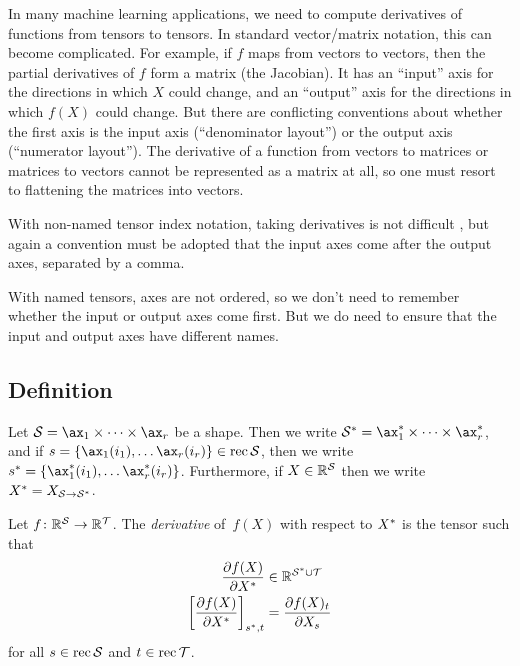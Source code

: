 In many machine learning applications, we need to compute derivatives of functions from tensors to tensors. In standard vector/matrix notation, this can become complicated.
For example, if $f$ maps from vectors to vectors, then the partial derivatives of $f$ form a matrix (the Jacobian). It has an ``input'' axis for the directions in which $X$ could change, and an ``output'' axis for the directions in which $f(X)$ could change.
But there are conflicting conventions about whether the first axis is the input axis (``denominator layout'') or the output axis (``numerator layout''). The derivative of a function from vectors to matrices or matrices to vectors cannot be represented as a matrix at all, so one must resort to flattening the matrices into vectors.

With non-named tensor index notation, taking derivatives is not difficult \citep{laue+:2018}, but again a convention must be adopted that the input axes come after the output axes, separated by a comma.

With named tensors, axes are not ordered, so we don't need to remember whether the input or output axes come first. But we do need to ensure that the input and output axes have different names.

\subsection{Definition}

\begin{definition}
Let $\mathcal{S} = \ax_1 \times \cdots \times \ax_r$ be a shape. Then we write $\mathcal{S\inax} = \ax_1\inax \times \cdots \times \ax_r\inax$, and if $s = \{\ax_1(i_1), \ldots \ax_r(i_r)\} \in \rec \mathcal{S}$, then we write $s\inax = \{\ax_1\inax(i_1), \ldots \ax_r\inax(i_r)\}$. Furthermore, if $X \in \mathbb{R}^\mathcal{S}$ then we write $X^* = X_{\mathcal{S}\rightarrow\mathcal{S}^*}$.
\end{definition}

\begin{definition}
Let $f \colon \mathbb{R}^\mathcal{S} \rightarrow \mathbb{R}^\mathcal{T}$. The \emph{derivative} of~$f(X)$ with respect to $X^*$  
is the tensor such that
\begin{align*}
  \frac{\partial f(X)}{\partial X^*} &\in \mathbb{R}^{\mathcal{S}^* \cup \mathcal{T}} \\
  \left[\frac{\partial f(X)}{\partial X^*} \right]_{s^*,t} &= \frac{\partial f(X)_t}{\partial X_s}
\end{align*}
for all $s \in \operatorname{rec}\mathcal{S}$ and $t \in \operatorname{rec}\mathcal{T}$.
\end{definition}

